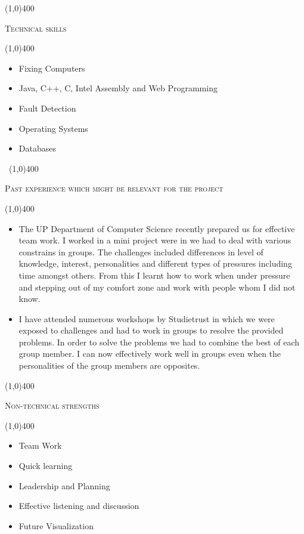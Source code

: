 \documentclass[12pt,a4paper]{report}
\begin{document}
	\begin{center}
	
	\line(1,0){400}\\
	{\scshape\large Technical skills\par}
	\line(1,0){400}\\
	\end{center}
		\begin{itemize}
\item Fixing Computers 
\item Java, C++, C, Intel Assembly and Web Programming  
\item Fault Detection
\item Operating Systems
\item Databases
\end{itemize}
\newpage
\begin{center}
	\vspace*{-3cm}\
	\line(1,0){400}\\
	{\scshape\large Past experience which might be relevant for the project\par}
	\line(1,0){400}\\
	\end{center}
		
	\begin{itemize}
		\item The UP Department of Computer Science recently prepared us for effective team work. I worked in a mini project were in  we had to deal with various constrains in groups. The challenges included differences in level of knowledge, interest, personalities and different types of pressures including time amongst others. From this I learnt how to work when under pressure and stepping out of my comfort zone and work with people whom I did not know.
		\item I have attended numerous workshops by Studietrust in which we were exposed to challenges and had to work in groups to resolve the provided problems. In order to solve the problems we had to combine the best of each group member. I can now effectively work well in groups even when the personalities of the group members are opposites.
\end{itemize}

	\begin{center}
	
	\line(1,0){400}\\
	{\scshape\large Non-technical strengths\par}
	\line(1,0){400}\\
	\end{center}
		\begin{itemize}
\item Team Work
\item Quick learning
\item Leadership and Planning
\item Effective listening and discussion
\item Future Visualization
\end{itemize}
\end{document}
